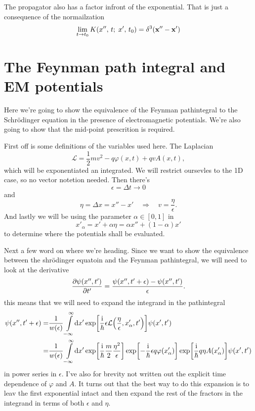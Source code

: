 \documentclass[11pt,letter, swedish, english
]{article}
\begin{document}
The propagator also has a factor infront of the exponential. That is
just a consequence of the normailzation
\begin{equation}
\lim_{t\to t_0} K(x'',\, t;\; x',\, t_0)
=\delta^3\qty(\vb{x}''-\vb{x}')
\end{equation}


\section{The Feynman path integral and EM potentials}
Here we're going to show the equivalence of the Feynman pathintegral
to the Schrödinger equation in the presence of electromagnetic
potentials. We're also going to show that the mid-point prescrition is
required. 

First off is some definitions of the variables used here.
The Laplacian
\begin{equation}
\mathcal{L}=\frac{1}{2}m v^2 - q\varphi(x, t) + qvA(x, t),
\end{equation}
which will be exponentiated an integrated. We will restrict oursevles
to the 1D case, so no vector notetion needed. Then there's
\begin{equation}
\epsilon=\Delta{t}\to0
\end{equation}
and
\begin{equation}
\eta=\Delta{x}=x''-x'
\quad\Longrightarrow\quad
v=\frac{\eta}{\epsilon}.
\end{equation}
And lastly we will be using the parameter $\alpha\in[0, 1]$ in
\begin{equation}
x'_\alpha=x'+\alpha\eta=\alpha x'' + (1-\alpha)x'
\end{equation}
to determine where the potentials shall be evaluated.

Next a few word on where we're heading. Since we want to show the
equivalence between the shrödinger equatoin and the Feynman
pathintegral, we will need to look at the derivative
\begin{equation}
\pdv{\psi(x'', t')}{t'} = \frac{\psi(x'', t'+\epsilon)-\psi(x'', t')}{\epsilon}.
\end{equation}
this means that we will need to expand the integrand in the pathintegral
\begin{equation}
\begin{aligned}
\psi(x'', t'+\epsilon)=&\frac{1}{w(\epsilon)}\int_{-\infty}^{\infty}\!\rd{x'}
\exp[\frac{\ii}{\hbar}\epsilon
\mathcal{L}\qty(\frac{\eta}{\epsilon}, x'_\alpha, t')]\psi(x', t')\\
=&\frac{1}{w(\epsilon)}\int_{-\infty}^{\infty}\!\rd{x'}
\exp[\frac{\ii}{\hbar}\frac{m}{2}\frac{\eta^2}{\epsilon}]
\exp[-\frac{\ii}{\hbar}\epsilon q\varphi(x'_\alpha)]
\exp[\frac{\ii}{\hbar} q\eta A(x'_\alpha)]
\psi(x', t')
\end{aligned}
\end{equation}
in power series in $\epsilon$. I've also for brevity not written out
the explicit time dependence of $\varphi$ and $A$. It turns out that
the best way to do this expansion is to leav the first exponential
intact and then expand the rest of the fractors in the integrand in
terms of both $\epsilon$ and $\eta$.
\end{document}
